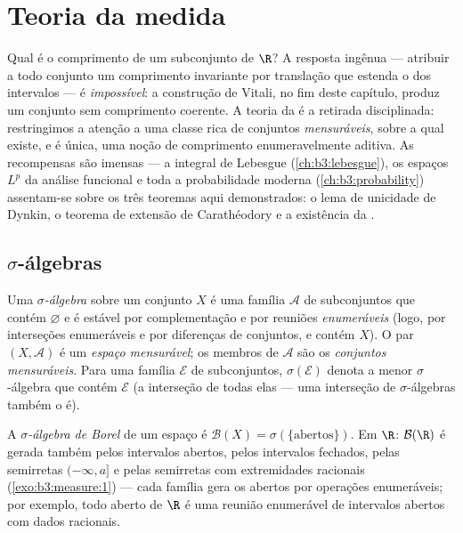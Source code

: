 \chapter{Teoria da medida}\label{ch:b3:measure}

Qual é o comprimento de um subconjunto de $\R$? A resposta ingênua
--- atribuir a todo conjunto um comprimento invariante por translação
que estenda o dos intervalos --- é \emph{impossível}: a construção de
Vitali, no fim deste capítulo, produz um conjunto sem comprimento
coerente. A teoria da  é a retirada disciplinada: restringimos a
atenção a uma classe rica de conjuntos \emph{mensuráveis}, sobre a qual
existe, e é única, uma noção de comprimento enumeravelmente aditiva. As
recompensas são imensas --- a integral de Lebesgue (\cref{ch:b3:lebesgue}), os
espaços $L^p$ da análise funcional e toda a probabilidade moderna
(\cref{ch:b3:probability}) assentam-se sobre os três teoremas aqui demonstrados: o
lema de unicidade de Dynkin, o teorema de extensão de Carathéodory e a
existência da .

\section{$\sigma$-álgebras}

\begin{definition}\label{def:b3:measure:sigmaalgebra}
Uma \emph{$\sigma$-álgebra}
sobre um conjunto $X$ é uma família $\mathcal A$ de subconjuntos que contém
$\varnothing$ e é estável por complementação e por reuniões
\emph{enumeráveis} (logo, por interseções enumeráveis e por diferenças
de conjuntos, e contém $X$). O par $(X, \mathcal A)$ é um \emph{espaço
mensurável}; os membros de $\mathcal A$ são os \emph{conjuntos mensuráveis}.
Para uma família $\mathcal E$ de subconjuntos, $\sigma(\mathcal E)$ denota a menor
$\sigma$-álgebra que contém $\mathcal E$ (a interseção de todas elas --- uma
interseção de $\sigma$-álgebras também o é).
\end{definition}

\begin{definition}\label{def:b3:measure:borel}
A \emph{$\sigma$-álgebra de Borel} de um espaço  é $\mathcal B(X) = \sigma(\{\text{abertos}\})$. Em
$\R$: $\mathcal B(\R)$ é gerada também pelos intervalos abertos, pelos
intervalos fechados, pelas semirretas $(-\infty, a]$ e pelas semirretas com
extremidades racionais (\cref{exo:b3:measure:1}) --- cada família gera os abertos
por operações enumeráveis; por exemplo, todo aberto de $\R$ é uma
reunião enumerável de intervalos abertos com dados racionais.
\end{definition}


